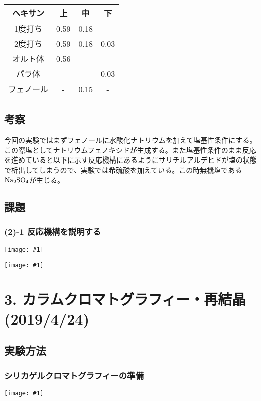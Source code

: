 \documentclass[a4paper,papersize,dvipdfmx]{jsarticle}
\newcommand{\pict}[2]{\begin{center} \texttt{[image: \#1]} \end{center}}   %
\begin{document}
\begin{table}[h]
\begin{tabular}{|c|c|c|c|}
\hline
ヘキサン  & 上    & 中    & 下    \\ \hline
1度打ち  & 0.59 & 0.18 & -    \\ \hline
2度打ち  & 0.59 & 0.18 & 0.03 \\ \hline
オルト体  & 0.56 & -    & -    \\ \hline
パラ体   & -    & -    & 0.03 \\ \hline
フェノール & -    & 0.15 & -    \\ \hline
\end{tabular}
\end{table}

\subsection*{考察}
今回の実験ではまずフェノールに水酸化ナトリウムを加えて塩基性条件にする。この際塩としてナトリウムフェノキシドが生成する。また塩基性条件のまま反応を進めていると以下に示す反応機構にあるようにサリチルアルデヒドが塩の状態で析出してしまうので、実験では希硫酸を加えている。この時無機塩である$\rm Na_2SO_4$が生じる。

\subsection*{課題}
\subsubsection*{(2)-1 反応機構を説明する}

\pict{imgs/2-hk1.jpeg}{10}
\pict{imgs/2-hk2.jpeg}{10}


\section*{3. カラムクロマトグラフィー・再結晶 (2019/4/24)}

\subsection*{実験方法}

\subsubsection*{シリカゲルクロマトグラフィーの準備}

\pict{imgs/3-1.jpg}{4.5}
\end{document}
